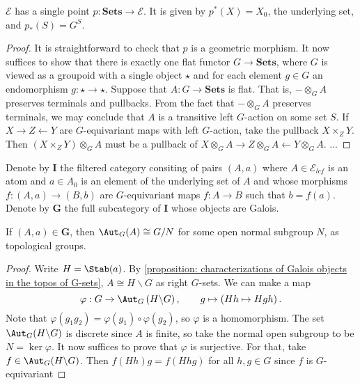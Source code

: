 \begin{lemma}
\label{lemma: topos of G-sets has a single point}
$\mathscr{E}$ has a single point $p : \mathbf{Sets} \to \mathscr{E}$. It is given by $p^*(X) = X_0$, the underlying set, and $p_*(S) = G^{S}$.
\end{lemma}
\begin{proof}
It is straightforward to check that $p$ is a geometric morphism. It now suffices to show that there is exactly one flat functor $G \to \mathbf{Sets}$, where $G$ is viewed as a groupoid with a single object $\star$ and for each element $g \in G$ an endomorphism $g : \star \to \star$. Suppose that $A : G \to \mathbf{Sets}$ is flat. That is, $- \otimes_G A$ preserves terminals and pullbacks. From the fact that $- \otimes_G A$ preserves terminals, we may conclude that $A$ is a transitive left $G$-action on some set $S$. If $X \to Z \leftarrow Y$ are $G$-equivariant maps with left $G$-action, take the pullback $X \times_Z Y$. Then $(X\times_Z Y) \otimes_G A$ must be a pullback of $X \otimes_G A \to Z \otimes_G A \leftarrow Y \otimes_G A$. ...
\end{proof}
Denote by $\mathbf{I}$ the filtered category consiting of pairs $(A,a)$ where $A \in \mathscr{E}_{lcf}$ is an atom and $a \in A_0$ is an element of the underlying set of $A$ and whose morphisms $f : (A,a) \to (B,b)$ are $G$-equivariant maps $f : A \to B$ such that $b = f(a)$. Denote by $\mathbf{G}$ the full subcategory of $\mathbf{I}$ whose objects are Galois.

\begin{lemma}
\label{lemma: characterization of automorphism groups of atoms}
If $(A,a) \in \mathbf{G}$, then $\Aut_G(A) \cong G/N$ for some open normal subgroup $N$, as topological groups.
\end{lemma}
\begin{proof}
Write $H = \Stab(a)$. By \cref{proposition: characterizations of Galois objects in the topos of G-sets}, $A \cong H \backslash G$ as right $G$-sets.  We can make a map
\[ \varphi : G \to \Aut_G\left( H \backslash G \right), \qquad g \mapsto \left( Hh \mapsto Hgh \right). \]
Note that $\varphi(g_1 g_2) = \varphi(g_1) \circ \varphi(g_2)$, so $\varphi$ is a homomorphism.
The set $\Aut_G(H \backslash G)$ is discrete since $A$ is finite, so take the normal open subgroup to be $N = \ker \varphi$.
It now suffices to prove that $\varphi$ is surjective.
For that, take $f \in \Aut_G(H \backslash G)$. Then $f(Hh)g = f(Hhg)$ for all $h,g \in G$ since $f$ is $G$-equivariant
\end{proof}

